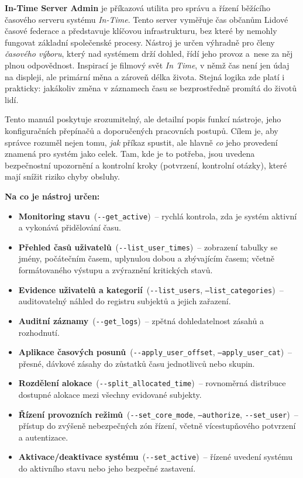 \documentclass[11pt,a4paper]{book}
\begin{document}
\textbf{In-Time Server Admin} je příkazová utilita pro správu a řízení běžícího časového serveru systému \emph{In-Time}. Tento server vyměřuje čas občanům Lidové časové federace a představuje klíčovou infrastrukturu, bez které by nemohly fungovat základní společenské procesy. Nástroj je určen výhradně pro členy \emph{časového výboru}, který nad systémem drží dohled, řídí jeho provoz a~nese za něj plnou odpovědnost. Inspirací je filmový svět \emph{In Time}, v němž čas není jen údaj na displeji, ale primární měna a zároveň délka života. Stejná logika zde platí i prakticky: jakákoliv změna v záznamech času se bezprostředně promítá do životů lidí.

Tento manuál poskytuje srozumitelný, ale detailní popis funkcí nástroje, jeho konfiguračních přepínačů a doporučených pracovních postupů. Cílem je, aby správce rozuměl nejen tomu, \emph{jak} příkaz spustit, ale hlavně \emph{co} jeho provedení znamená pro systém jako celek. Tam, kde je to potřeba, jsou uvedena bezpečnostní upozornění a kontrolní kroky (potvrzení, kontrolní otázky), které mají snížit riziko chyby obsluhy.

\medskip
\noindent\textbf{Na co je nástroj určen:}
\begin{itemize}
    \item \textbf{Monitoring stavu}~(\texttt{{-}{-}get\_active})~– rychlá kontrola, zda je systém aktivní a vykonává přidělování času.
    \item \textbf{Přehled časů uživatelů}~(\texttt{{-}{-}list\_user\_times})~– zobrazení tabulky se jmény, počátečním časem, uplynulou dobou a zbývajícím časem; včetně formátovaného výstupu a zvýraznění kritických stavů.
    \item \textbf{Evidence uživatelů a kategorií}~(\texttt{{-}{-}list\_users}, \texttt{--list\_categories})~– auditovatelný náhled do registru subjektů a jejich zařazení.
    \item \textbf{Auditní záznamy}~(\texttt{{-}{-}get\_logs})~– zpětná dohledatelnost zásahů a rozhodnutí.
    \item \textbf{Aplikace časových posunů}~(\texttt{{-}{-}apply\_user\_offset}, \texttt{--apply\_user\_cat})~– přesné, dávkové zásahy do zůstatků času jednotlivců nebo skupin.
    \item \textbf{Rozdělení alokace}~(\texttt{{-}{-}split\_allocated\_time})~– rovnoměrná distribuce dostupné alokace mezi všechny evidované subjekty.
    \item \textbf{Řízení provozních režimů}~(\texttt{{-}{-}set\_core\_mode}, \texttt{--authorize}, \texttt{{-}{-}set\_user})~– přístup do zvýšeně nebezpečných zón řízení, včetně vícestupňového potvrzení a autentizace.
    \item \textbf{Aktivace/deaktivace systému}~(\texttt{{-}{-}set\_active})~– řízené uvedení systému do aktivního stavu nebo jeho bezpečné zastavení.
\end{itemize}
\end{document}
